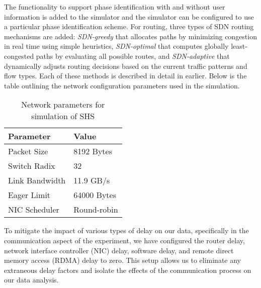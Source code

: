 The functionality to support phase identification with and without user
information is added to the simulator and the simulator can be configured
to use a particular phase identification scheme. For routing, 
three types of SDN routing mechanisms are added: 
{\em SDN-greedy} that allocates paths by minimizing congestion in real time using simple heuristics, 
{\em SDN-optimal} that computes globally least-congested paths by evaluating all possible routes, and {\em SDN-adaptive} that dynamically adjusts
routing decisions based on the current traffic patterns and flow types.
Each of these methods is described in detail in earlier. Below is the
table outlining the network configuration parameters used in the simulation.

\begin{table}[h]
\centering
\caption{Network parameters for simulation of SHS}
\label{tab:params}
\vspace{1em}
\begin{tabular}{ll}
\toprule
Parameter & Value \\
\midrule
Packet Size     & 8192 Bytes \\
Switch Radix    & 32 \\
Link Bandwidth  & 11.9 GB/s \\
Eager Limit     & 64000 Bytes \\
NIC Scheduler   & Round-robin \\
\bottomrule
\end{tabular}
\end{table}

To mitigate the impact of various types of delay on our data, specifically in 
the communication aspect of the experiment, we have configured the router 
delay, network interface controller (NIC) delay, software delay, and remote 
direct memory access (RDMA) delay to zero. This setup allows us to eliminate 
any extraneous delay factors and isolate the effects of the communication 
process on our data analysis.

